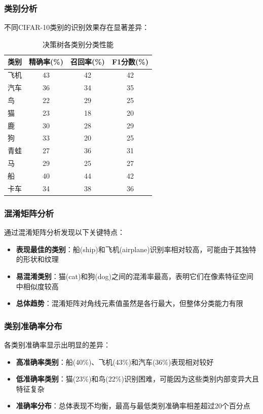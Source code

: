 \documentclass[UTF8]{report}
\theoremstyle{MyLineTheoremStyle} %
\theoremstyle{MyBlockTheoremStyle} %
\theoremstyle{MySubsubsectionStyle} %
\begin{document}
\subsubsection{类别分析}
不同CIFAR-10类别的识别效果存在显著差异：

\begin{table}[h]
\centering
\caption{决策树各类别分类性能}
\begin{tabular}{l c c c}
\toprule
\textbf{类别} & \textbf{精确率(\%)} & \textbf{召回率(\%)} & \textbf{F1分数(\%)} \\
\midrule
飞机 & 43 & 42 & 42 \\
汽车 & 36 & 34 & 35 \\
鸟 & 22 & 29 & 25 \\
猫 & 23 & 18 & 20 \\
鹿 & 30 & 28 & 29 \\
狗 & 33 & 20 & 25 \\
青蛙 & 27 & 36 & 31 \\
马 & 29 & 25 & 27 \\
船 & 40 & 44 & 42 \\
卡车 & 34 & 38 & 36 \\
\bottomrule
\end{tabular}
\end{table}

\subsubsection{混淆矩阵分析}
通过混淆矩阵分析发现以下关键特点：
\begin{itemize}
    \item \textbf{表现最佳的类别}：船(ship)和飞机(airplane)识别率相对较高，可能由于其独特的形状和纹理
    \item \textbf{易混淆类别}：猫(cat)和狗(dog)之间的混淆率最高，表明它们在像素特征空间中相似度较高
    \item \textbf{总体趋势}：混淆矩阵对角线元素值虽然是各行最大，但整体分类能力有限
\end{itemize}

\subsubsection{类别准确率分布}
各类别准确率显示出明显的差异：
\begin{itemize}
    \item \textbf{高准确率类别}：船(40\%)、飞机(43\%)和汽车(36\%)表现相对较好
    \item \textbf{低准确率类别}：猫(23\%)和鸟(22\%)识别困难，可能因为这些类别内部变异大且特征复杂
    \item \textbf{准确率分布}：总体表现不均衡，最高与最低类别准确率相差超过20个百分点
\end{itemize}
\end{document}
